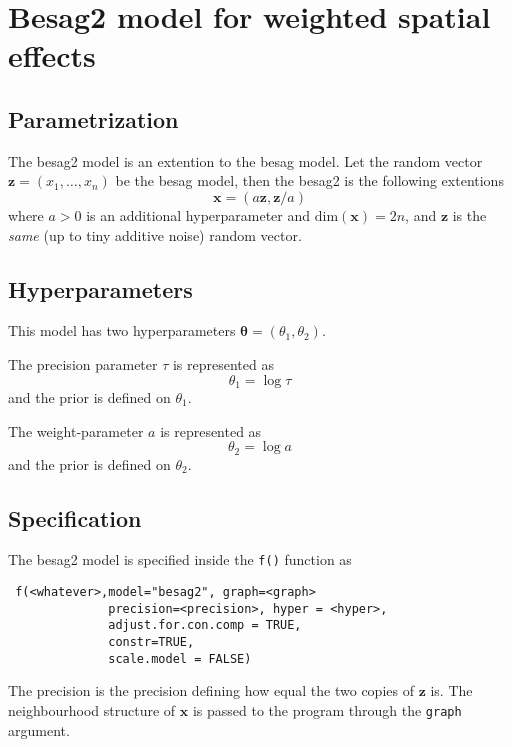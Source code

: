 \documentclass[a4paper,11pt]{article}
\begin{document}
\section*{Besag2 model for weighted spatial effects}

\subsection*{Parametrization}

The besag2 model is an extention to the besag model. Let the random
vector $\mathbf{z}=(x_1,\dots,x_n)$ be the besag model, then the
besag2 is the following extentions
\begin{displaymath}
    \mathbf{x} = (a\mathbf{z}, \mathbf{z}/a)
\end{displaymath}
where $a>0$ is an additional hyperparameter and
$\text{dim}(\mathbf{x}) = 2n$, and $\mathbf{z}$ is the \emph{same} (up
to tiny additive noise) random vector.

\subsection*{Hyperparameters}

This model has two hyperparameters $\mathbf{\theta} = (\theta_{1},
\theta_{2})$.

The precision parameter $\tau$ is represented as
\begin{displaymath}
    \theta_{1} =\log \tau
\end{displaymath}
and the prior is defined on $\theta_{1}$.

The weight-parameter $a$ is represented as
\begin{displaymath}
    \theta_{2} = \log a
\end{displaymath}
and the prior is defined on $\theta_{2}$.

\subsection*{Specification}

The besag2 model is specified inside the {\tt f()} function as
\begin{verbatim}
 f(<whatever>,model="besag2", graph=<graph>
              precision=<precision>, hyper = <hyper>,
              adjust.for.con.comp = TRUE,
              constr=TRUE,
              scale.model = FALSE)
\end{verbatim}

The precision is the precision defining how equal the two copies of
$\mathbf{z}$ is. The neighbourhood structure of $\mathbf{x}$ is passed
to the program through the {\tt graph} argument.
\end{document}
